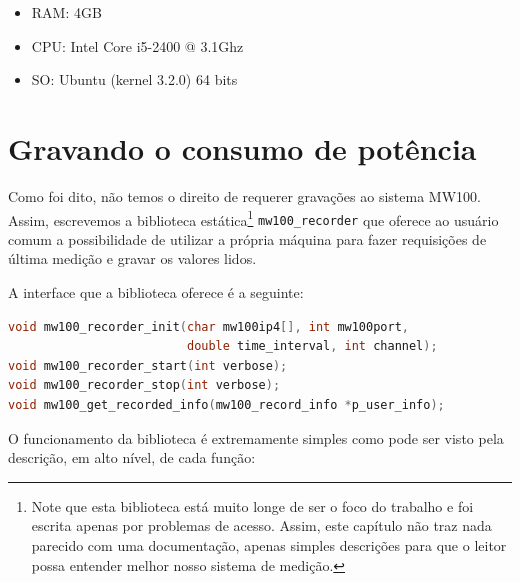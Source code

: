 \begin{itemize}
    \item RAM: 4GB
    \item CPU: Intel Core i5-2400 @ 3.1Ghz
    \item SO: Ubuntu (kernel 3.2.0) 64 bits
\end{itemize}

\section{Gravando o consumo de potência}
\mbox{}

Como foi dito, não temos o direito de requerer gravações ao sistema MW100. Assim, escrevemos a biblioteca estática\footnote{Note que esta biblioteca está muito longe de ser o foco do trabalho e foi escrita apenas por problemas de acesso. Assim, este capítulo não traz nada parecido com uma documentação, apenas simples descrições para que o leitor possa entender melhor nosso sistema de medição.} {\tt mw100\_recorder} que oferece ao usuário comum a possibilidade de utilizar a própria máquina para fazer requisições de última medição e gravar os valores lidos.


A interface que a biblioteca oferece é a seguinte:

\begin{lstlisting}[language=C, basicstyle=\ttfamily\footnotesize, frame=single]
void mw100_recorder_init(char mw100ip4[], int mw100port, 
                         double time_interval, int channel);
void mw100_recorder_start(int verbose);
void mw100_recorder_stop(int verbose);
void mw100_get_recorded_info(mw100_record_info *p_user_info);
\end{lstlisting}

O funcionamento da biblioteca é extremamente simples como pode ser visto pela descrição, em alto nível, de cada função:

